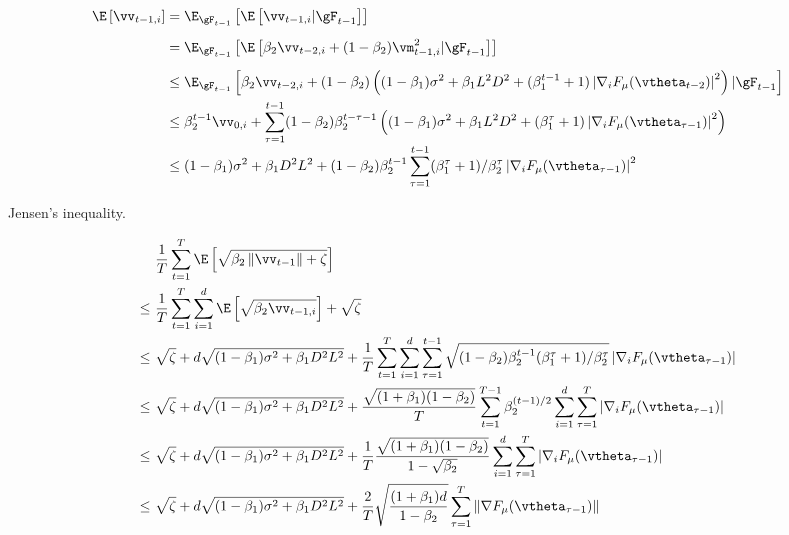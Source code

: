 \begin{equation}
\begin{aligned}
\E\left[ \vv_{t-1,i}\right] &= \E_{\gF_{t-1}}\left[\E\left[ \vv_{t-1,i}|\gF_{t-1}\right]\right] \\[5pt]
&= \E_{\gF_{t-1}}\left[\E\left[\beta_2 \vv_{t-2,i} + (1-\beta_2)\vm^2_{t-1,i}|\gF_{t-1}\right]\right] \\[5pt]
&\leq \E_{\gF_{t-1}}\left[\beta_2\vv_{t-2,i} + (1-\beta_2)\left((1-\beta_1)\sigma^2 + \beta_1 L^2D^2 + (\beta_1^{t-1} + 1) \left|\nabla_i F_{\mu}(\vtheta_{t-2})\right|^2\right)|\gF_{t-1}\right] \\
&\leq \beta_2^{t-1}\vv_{0,i} + \sum_{\tau=1}^{t-1}(1-\beta_2)\beta_2^{t-\tau-1}\left((1-\beta_1)\sigma^2 + \beta_1 L^2D^2 + (\beta_1^{\tau} + 1) \left|\nabla_i F_{\mu}(\vtheta_{\tau-1})\right|^2\right) \\[-3pt]
&\leq (1-\beta_1)\sigma^2 + \beta_1 D^2L^2 + (1-\beta_2)\beta_2^{t-1}\sum_{\tau=1}^{t-1}(\beta_1^{\tau}+1)/\beta_2^{\tau} \left|\nabla_i F_{\mu}(\vtheta_{\tau-1})\right|^2
\end{aligned}
\end{equation}

Jensen's inequality.

\begin{equation}
\begin{aligned}
&\,\,\frac{1}{T}\sum_{t=1}^T \E\left[\sqrt{\beta_2\left\|\vv_{t-1}\right\|+\zeta}\right] \\
\leq&\,\, \frac{1}{T}\sum_{t=1}^T\sum_{i=1}^d \E\left[\sqrt{\beta_2\vv_{t-1,i}}\right] + \sqrt{\zeta} \\
\leq&\,\, \sqrt{\zeta} + d\sqrt{(1-\beta_1)\sigma^2 + \beta_1 D^2L^2} + \frac{1}{T}\sum_{t=1}^T\sum_{i=1}^d\sum_{\tau=1}^{t-1} \sqrt{(1-\beta_2)\beta_2^{t-1}(\beta_1^{\tau}+1)/\beta_2^{\tau}} \left|\nabla_i F_{\mu}(\vtheta_{\tau-1})\right| \\
\leq&\,\, \sqrt{\zeta} + d\sqrt{(1-\beta_1)\sigma^2 + \beta_1 D^2L^2} + \frac{\sqrt{(1+\beta_1)(1-\beta_2)}}{T}\sum_{t=1}^{T-1} \beta_2^{(t-1)/2}\sum_{i=1}^d\sum_{\tau=1}^{T} \left|\nabla_i F_{\mu}(\vtheta_{\tau-1})\right| \\
\leq&\,\, \sqrt{\zeta} + d\sqrt{(1-\beta_1)\sigma^2 + \beta_1 D^2L^2} + \frac{1}{T}\frac{\sqrt{(1+\beta_1)(1-\beta_2)}}{1 - \sqrt{\beta_2}}\sum_{i=1}^d \sum_{\tau=1}^{T} \left|\nabla_i F_{\mu}(\vtheta_{\tau-1})\right| \\
\leq&\,\, \sqrt{\zeta} + d\sqrt{(1-\beta_1)\sigma^2 + \beta_1 D^2L^2} + \frac{2}{T}\sqrt{\frac{(1+\beta_1)d}{1-\beta_2}}\sum_{\tau=1}^{T} \left\|\nabla F_{\mu}(\vtheta_{\tau-1})\right\|
\end{aligned}
\end{equation}

